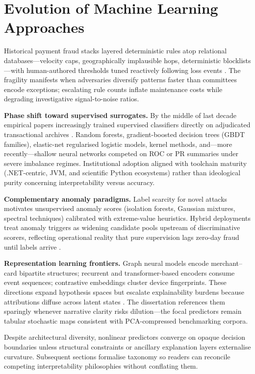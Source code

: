 \section{Evolution of Machine Learning Approaches}
Historical payment fraud stacks layered deterministic rules atop relational databases—velocity caps, geographically implausible hops, deterministic blocklists—with human-authored thresholds tuned reactively following loss events \cite{fraud_handbook}. The fragility manifests when adversaries diversify patterns faster than committees encode exceptions; escalating rule counts inflate maintenance costs while degrading investigative signal-to-noise ratios.

\textbf{Phase shift toward supervised surrogates.} By the middle of last decade empirical papers increasingly trained supervised classifiers directly on adjudicated transactional archives \cite{lucas_jurgovsky_ccfraud_survey2020}. Random forests, gradient-boosted decision trees (GBDT families), elastic-net regularised logistic models, kernel methods, and—more recently—shallow neural networks competed on ROC or PR summaries under severe imbalance regimes. Institutional adoption aligned with toolchain maturity (.NET-centric, JVM, and scientific Python ecosystems) rather than ideological purity concerning interpretability versus accuracy.

\textbf{Complementary anomaly paradigms.} Label scarcity for novel attacks motivates unsupervised anomaly scores (isolation forests, Gaussian mixtures, spectral techniques) calibrated with extreme-value heuristics. Hybrid deployments treat anomaly triggers as widening candidate pools upstream of discriminative scorers, reflecting operational reality that pure supervision lags zero-day fraud until labels arrive \cite{yousefi_fraud_survey2019,fraud_handbook}.

\textbf{Representation learning frontiers.} Graph neural models encode merchant--card bipartite structures; recurrent and transformer-based encoders consume event sequences; contrastive embeddings cluster device fingerprints. These directions expand hypothesis spaces but escalate explainability burdens because attributions diffuse across latent states \cite{lucas_jurgovsky_ccfraud_survey2020}. The dissertation references them sparingly whenever narrative clarity risks dilution—the focal predictors remain tabular stochastic maps consistent with PCA-compressed benchmarking corpora.

Despite architectural diversity, nonlinear predictors converge on opaque decision boundaries unless structural constraints or ancillary explanation layers externalise curvature. Subsequent sections formalise taxonomy so readers can reconcile competing interpretability philosophies without conflating them.

